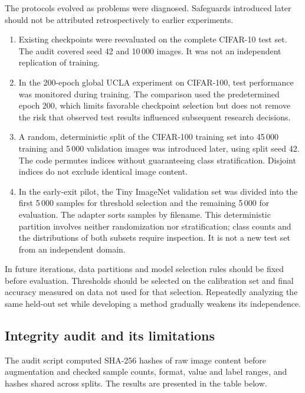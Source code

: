 \documentclass[12pt,a4paper]{article}
\begin{document}
The protocols evolved as problems were diagnosed. Safeguards introduced
later should not be attributed retrospectively to earlier experiments.
\begin{enumerate}
\item Existing checkpoints were reevaluated on
the complete CIFAR-10 test set. The audit covered seed 42 and 10\,000
images. It was not an independent replication of training.
\item In the 200-epoch global UCLA experiment on CIFAR-100, test performance
was monitored during training. The comparison used the predetermined
epoch 200, which limits favorable checkpoint selection but does not remove
the risk that observed test results influenced subsequent research decisions.
\item A random, deterministic split of the CIFAR-100 training set into
45\,000 training and 5\,000 validation images was introduced later,
using split seed 42. The code permutes indices without guaranteeing
class stratification. Disjoint indices do not exclude identical image content.
\item In the early-exit pilot, the Tiny ImageNet validation set was divided
into the first 5\,000 samples for threshold selection and the remaining
5\,000 for evaluation.
The adapter sorts samples by filename. This deterministic partition
involves neither randomization nor stratification; class counts and
the distributions of both subsets require inspection.
It is not a new test set from an independent domain.
\end{enumerate}

In future iterations, data partitions and model selection rules should
be fixed before evaluation. Thresholds should be selected on the calibration
set and final accuracy measured on data not used for that selection.
Repeatedly analyzing the same held-out set while developing a method
gradually weakens its independence.

\subsection{Integrity audit and its limitations}

The audit script computed SHA-256 hashes of raw image content before
augmentation and checked sample counts, format, value and label ranges,
and hashes shared across splits. The results are presented in the table below.
\end{document}
